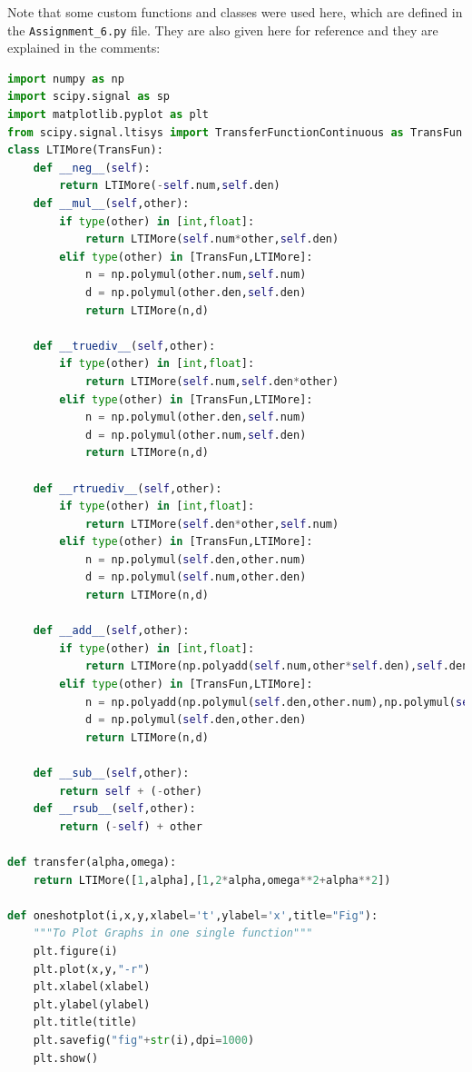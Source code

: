 \documentclass[12pt]{article}
\begin{document}
Note that some custom functions and classes were used here, which are defined in the \texttt{Assignment\_6.py} file. They are also given here for reference and they are explained in the comments:

\begin{lstlisting}[language=Python]
import numpy as np
import scipy.signal as sp
import matplotlib.pyplot as plt
from scipy.signal.ltisys import TransferFunctionContinuous as TransFun
class LTIMore(TransFun):
    def __neg__(self):
        return LTIMore(-self.num,self.den)
    def __mul__(self,other):
        if type(other) in [int,float]:
            return LTIMore(self.num*other,self.den)
        elif type(other) in [TransFun,LTIMore]:
            n = np.polymul(other.num,self.num)
            d = np.polymul(other.den,self.den)
            return LTIMore(n,d)
    
    def __truediv__(self,other):
        if type(other) in [int,float]:
            return LTIMore(self.num,self.den*other)
        elif type(other) in [TransFun,LTIMore]:
            n = np.polymul(other.den,self.num)
            d = np.polymul(other.num,self.den)
            return LTIMore(n,d)
    
    def __rtruediv__(self,other):
        if type(other) in [int,float]:
            return LTIMore(self.den*other,self.num)
        elif type(other) in [TransFun,LTIMore]:
            n = np.polymul(self.den,other.num)
            d = np.polymul(self.num,other.den)
            return LTIMore(n,d)
    
    def __add__(self,other):
        if type(other) in [int,float]:
            return LTIMore(np.polyadd(self.num,other*self.den),self.den)
        elif type(other) in [TransFun,LTIMore]:
            n = np.polyadd(np.polymul(self.den,other.num),np.polymul(self.num,other.den))
            d = np.polymul(self.den,other.den)
            return LTIMore(n,d)
    
    def __sub__(self,other):
        return self + (-other)
    def __rsub__(self,other):
        return (-self) + other

def transfer(alpha,omega):
    return LTIMore([1,alpha],[1,2*alpha,omega**2+alpha**2])

def oneshotplot(i,x,y,xlabel='t',ylabel='x',title="Fig"):
    """To Plot Graphs in one single function"""
    plt.figure(i)
    plt.plot(x,y,"-r")
    plt.xlabel(xlabel)
    plt.ylabel(ylabel)
    plt.title(title)
    plt.savefig("fig"+str(i),dpi=1000)
    plt.show()
\end{lstlisting}
\end{document}
